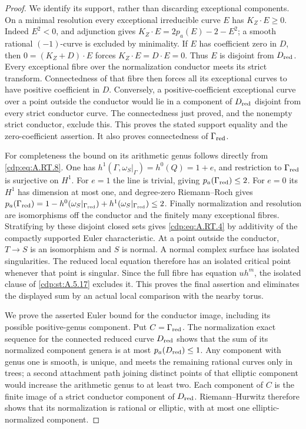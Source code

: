 \begin{proof}
We identify its support, rather than discarding exceptional
components. On a minimal resolution every exceptional
irreducible curve $E$ has $K_Z\cdot E\ge0$. Indeed
$E^2<0$, and adjunction gives
$K_Z\cdot E=2p_a(E)-2-E^2$; a smooth rational
$(-1)$-curve is excluded by minimality. If $E$ has coefficient
zero in $D$, then
$0=(K_Z+D)\cdot E$ forces $K_Z\cdot E=D\cdot E=0$.
Thus $E$ is disjoint from $D_{\rm red}$.
Every exceptional fibre over the normalization conductor meets
its strict transform. Connectedness of that fibre then forces
all its exceptional curves to have positive coefficient in $D$.
Conversely, a positive-coefficient exceptional curve over a point
outside the conductor would lie in a component of $D_{\rm red}$
disjoint from every strict conductor curve. The connectedness
just proved, and the nonempty strict conductor, exclude this.
This proves the stated support equality and the zero-coefficient
assertion. It also proves connectedness of $\Gamma_{\rm red}$.

For completeness the bound on its arithmetic genus follows
directly from \eqref{cdp:eq:A.RT.8}. One has
$h^1(\Gamma,\omega_S|_\Gamma)=h^0(Q)=1+e$,
and restriction to $\Gamma_{\rm red}$ is surjective on $H^1$.
For $e=1$ the line is trivial, giving
$p_a(\Gamma_{\rm red})\le2$. For $e=0$ its $H^1$ has
dimension at most one, and degree-zero Riemann--Roch gives
$p_a(\Gamma_{\rm red})=1-h^0(\omega_S|_{\Gamma_{\rm red}})
+h^1(\omega_S|_{\Gamma_{\rm red}})\le2$.
Finally normalization and resolution are isomorphisms off the
conductor and the finitely many exceptional fibres.
Stratifying by these disjoint closed sets gives \eqref{cdp:eq:A.RT.4} by
additivity of the compactly supported Euler characteristic.
At a point outside the conductor, $T\to S$ is an
isomorphism and $S$ is normal. A normal complex surface
has isolated singularities. The reduced local equation
therefore has an isolated critical point whenever that
point is singular. Since the full fibre has equation
$u h^m$, the isolated clause of \ref{cdp:st:A.5.17} excludes it.
This proves the final assertion and eliminates the displayed
sum by an actual local comparison with the nearby torus.

We prove the asserted Euler bound for the conductor image,
including its possible positive-genus component. Put
$C=\Gamma_{\rm red}$. The normalization exact sequence for
the connected reduced curve $D_{\rm red}$ shows that the sum
of its normalized component genera is at most
$p_a(D_{\rm red})\le1$. Any component with genus one is
smooth, is unique, and meets the remaining rational curves
only in trees; a second attachment path joining distinct
points of that elliptic component would increase the
arithmetic genus to at least two. Each component of $C$ is
the finite image of a strict conductor component of
$D_{\rm red}$. Riemann--Hurwitz therefore shows that its
normalization is rational or elliptic, with at most one
elliptic-normalized component.


\end{proof}
